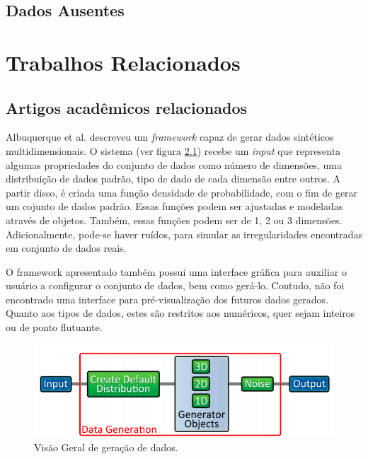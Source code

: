 \documentclass[
	12pt,				%
	openright,			%
	twoside,			%
	a4paper,			%
	english,			%
	brazil				%
	]{abntex2}
\begin{document}
		\section{Dados Ausentes}
			
	\chapter{Trabalhos Relacionados}

		\section{Artigos acadêmicos relacionados}
			Albuquerque et al. \cite{Albuquerque2011} descreveu um \emph{framework} capaz de gerar dados sintéticos multidimensionais. O sistema (ver figura \ref{fig:albuquerque}) recebe um \emph{input} que representa algumas propriedades do conjunto de dados como número de dimensões, uma distribuição de dados padrão, tipo de dado de cada dimensão entre outros. A partir disso, é criada uma função densidade de probabilidade, com o fim de gerar um cojunto de dados padrão. Essas funções podem ser ajustadas e modeladas através de objetos. Também, essas funções podem ser de 1, 2 ou 3 dimensões. Adicionalmente, pode-se haver ruídos, para simular as irregularidades encontradas em conjunto de dados reais.
			\par
			O framework apresentado também possui uma interface gráfica para auxiliar o usuário a configurar o conjunto de dados, bem como gerá-lo. Contudo, não foi encontrado uma interface para pré-visualização dos futuros dados gerados. Quanto aos tipos de dados, estes são restritos aos numéricos, quer sejam inteiros ou de ponto flutuante.    
			\begin{figure}[h!]
				\centering
				\includegraphics[width=\linewidth]{./figures/TrabalhosRelacionados/Albuquerque10.png}
				\caption{Visão Geral de geração de dados.}
				\label{fig:albuquerque}
			\end{figure}
\end{document}
